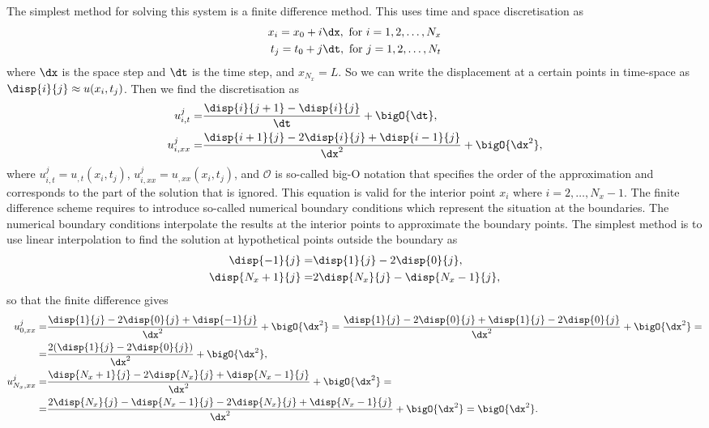 \documentclass[twoside,a4paper,12pt,draft]{article}
\begin{document}
The simplest method for solving this system is a finite difference
method. This uses time and space discretisation as
%
\begin{subequations}
  \begin{align}
    x_i = x_0 + i\dx, \text{ for } i = 1, 2, \dots, N_x \\
    t_j = t_0 + j\dt, \text{ for } j = 1, 2, \dots, N_t
  \end{align} \label{eq:discr}
\end{subequations}
%
where $\dx$ is the space step and $\dt$ is the time step, and $x_{N_x} = L$.  So we can
write the displacement at a certain points in time-space as
$\disp{i}{j} \approx u(x_i,t_j)$. Then we find the discretisation as
%
\begin{subequations}
  \begin{align}
    u_{i,t}^j  =& \frac{\disp{i}{j+1} - \disp{i}{j}}{\dt} + \bigO{\dt}, \\
    u_{i,xx}^j =& \frac{\disp{i+1}{j} - 2\disp{i}{j} + \disp{i-1}{j}}{\dx^2} + \bigO{\dx^2},
  \end{align}\label{eq:fin-diff}
\end{subequations}
%
where $u_{i,t}^j = u_{,t}(x_i,t_j)$, $u_{i,xx}^j = u_{,xx}(x_i,t_j)$,
and $\mathcal{O}$ is so-called big-O notation that specifies the order
of the approximation and corresponds to the part of the solution that
is ignored. This equation is valid for the interior point $x_i$ where
$i = 2,\dots, N_x-1$. The finite difference scheme requires to
introduce so-called numerical boundary conditions which represent the
situation at the boundaries. The numerical boundary conditions
interpolate the results at the interior points to approximate the
boundary points. The simplest method is to use linear interpolation to
find the solution at hypothetical points outside the boundary as
%
\begin{subequations}
\begin{align}
  \disp{-1}{j} =& \disp{1}{j} - 2\disp{0}{j}, \\
  \disp{N_x+1}{j} =& 2\disp{N_x}{j} - \disp{N_x-1}{j},
\end{align}
\end{subequations}
%
so that the finite difference gives
%
\begin{align}
  u_{0,xx}^j =& \frac{\disp{1}{j} - 2\disp{0}{j} + \disp{-1}{j}}{\dx^2} + \bigO{\dx^2} =
  \frac{\disp{1}{j} - 2\disp{0}{j} + \disp{1}{j} - 2\disp{0}{j}}{\dx^2} + \bigO{\dx^2} =\nonumber \\
  =&\frac{2(\disp{1}{j} - 2\disp{0}{j})}{\dx^2} + \bigO{\dx^2},
  \\
  u_{N_x,xx}^j =& \frac{\disp{N_x+1}{j} - 2\disp{N_x}{j} + \disp{N_x-1}{j}}{\dx^2} + \bigO{\dx^2} =\nonumber \\
  =&\frac{2\disp{N_x}{j} - \disp{N_x-1}{j} - 2\disp{N_x}{j} + \disp{N_x-1}{j}}{\dx^2} + \bigO{\dx^2} = \bigO{\dx^2}.
     \label{eq:error-bigO}
\end{align}
\end{document}
